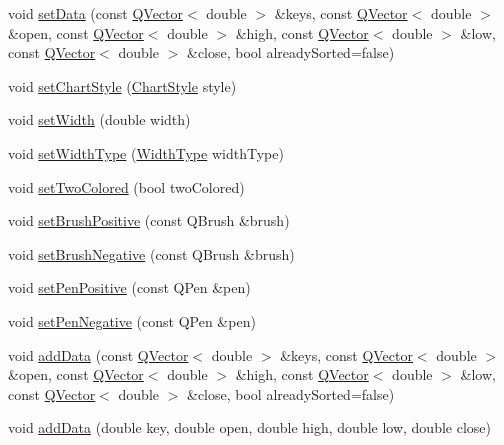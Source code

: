 \begin{DoxyCompactItemize}
\item 
void \hyperlink{class_q_c_p_financial_a12992e669ed19d7bb48dbe601570cc05}{set\+Data} (const \hyperlink{class_q_vector}{Q\+Vector}$<$ double $>$ \&keys, const \hyperlink{class_q_vector}{Q\+Vector}$<$ double $>$ \&open, const \hyperlink{class_q_vector}{Q\+Vector}$<$ double $>$ \&high, const \hyperlink{class_q_vector}{Q\+Vector}$<$ double $>$ \&low, const \hyperlink{class_q_vector}{Q\+Vector}$<$ double $>$ \&close, bool already\+Sorted=false)
\item 
void \hyperlink{class_q_c_p_financial_a5a59175d36279d71596e64d7bb65596f}{set\+Chart\+Style} (\hyperlink{class_q_c_p_financial_a0f800e21ee98d646dfc6f8f89d10ebfb}{Chart\+Style} style)
\item 
void \hyperlink{class_q_c_p_financial_a99633f8bac86a61d534ae5eeb1a3068f}{set\+Width} (double width)
\item 
void \hyperlink{class_q_c_p_financial_a204b7b710352796593a432b723e34089}{set\+Width\+Type} (\hyperlink{class_q_c_p_financial_aef1761dda71a53dc5269685e9e492626}{Width\+Type} width\+Type)
\item 
void \hyperlink{class_q_c_p_financial_a138e44aac160a17a9676652e240c5f08}{set\+Two\+Colored} (bool two\+Colored)
\item 
void \hyperlink{class_q_c_p_financial_a5ebff2b1764efd07cc44942e67821829}{set\+Brush\+Positive} (const Q\+Brush \&brush)
\item 
void \hyperlink{class_q_c_p_financial_a8bbdd87629f9144b3ef51af660c0961a}{set\+Brush\+Negative} (const Q\+Brush \&brush)
\item 
void \hyperlink{class_q_c_p_financial_ac58aa3adc7a35aab0088764b840683e5}{set\+Pen\+Positive} (const Q\+Pen \&pen)
\item 
void \hyperlink{class_q_c_p_financial_afe5c07e94ccea01a75b3a2476993c346}{set\+Pen\+Negative} (const Q\+Pen \&pen)
\item 
void \hyperlink{class_q_c_p_financial_a372ac031e44a7a6c912d203556af96f7}{add\+Data} (const \hyperlink{class_q_vector}{Q\+Vector}$<$ double $>$ \&keys, const \hyperlink{class_q_vector}{Q\+Vector}$<$ double $>$ \&open, const \hyperlink{class_q_vector}{Q\+Vector}$<$ double $>$ \&high, const \hyperlink{class_q_vector}{Q\+Vector}$<$ double $>$ \&low, const \hyperlink{class_q_vector}{Q\+Vector}$<$ double $>$ \&close, bool already\+Sorted=false)
\item 
void \hyperlink{class_q_c_p_financial_a688bbd052e00a02954ddb0068b378170}{add\+Data} (double key, double open, double high, double low, double close)

\end{DoxyCompactItemize}
